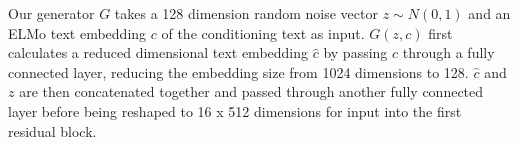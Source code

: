 Our generator $G$ takes a 128 dimension random noise vector $z \sim N(0, 1)$ and an ELMo text embedding $c$ of the conditioning text as input. $G(z, c)$ first calculates a reduced dimensional text embedding $\hat{c}$ by passing $c$ through a fully connected layer, reducing the embedding size from 1024 dimensions to 128. $\hat{c}$ and $z$ are then concatenated together and passed through another fully connected layer before being reshaped to 16 x 512 dimensions for input into the first residual block.